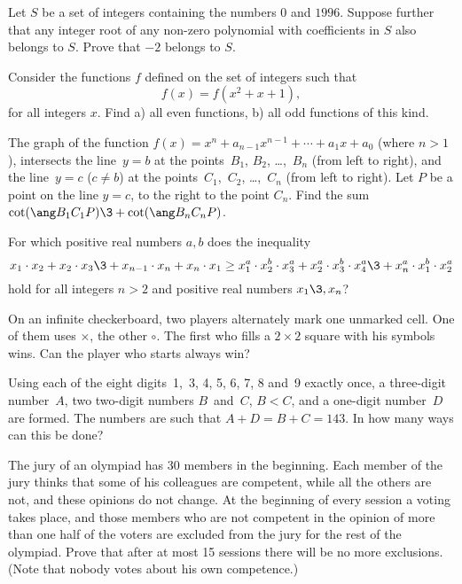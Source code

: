 \prob  %
Let $S$ be a set of integers 
containing the numbers $0$ and $1996$.
Suppose further that any integer root of any
non-zero polynomial with 
coefficients  in $S$ also belongs to $S$. Prove that $-2$ belongs to $S.$





\prob %
Consider the functions $f$ defined on the set of integers such that
   $$f(x)=f(x^2+x+1),$$
for all integers $x$. Find a) all even functions, 
b) all odd functions of this kind.



\prob  %
The graph of the function $f(x)=x^n+a_{n-1}x^{n-1}+\cdots+a_1x+a_0$ (where
$n>1$), intersects the
line~$y=b$ at the points~$B_1$, $B_2$, \dots,~$B_n$ (from left to right),
and the line~$y=c$ ($c\ne b$) at the points~$C_1$,~$C_2$, \dots,~$C_n$
(from left to right).
Let $P$ be a point on the line $y=c$, to the right to the point $C_n$.
Find the sum $\cot(\ang B_1C_1P)\3+\cot(\ang B_nC_nP)$.




\prob   %
For which positive real numbers $a,b$ does the inequality
  $$x_1\cdot x_2+x_2\cdot x_3\3+x_{n-1}\cdot x_n+x_n\cdot x_1
    \ge x_1^a\cdot x_2^b\cdot x_3^a+x_2^a\cdot x_3^b\cdot 
        x_4^a\3+x_n^a\cdot x_1^b\cdot x_2^a$$
hold for all integers $n>2$ and positive real numbers $x_1\3,x_n$?



\prob %
On an infinite checkerboard, two players alternately mark one 
unmarked cell.
One of them uses $\times$, the other $\circ$.  The first who fills
a $2\times 2$ square with his symbols wins.  Can the player who starts
always win?


\prob %
Using each of the eight digits~1,~3, 4, 5, 6, 7, 8 and~9 exactly
once, a three-digit number~$A$, two two-digit numbers
$B$~and~$C$, $B<C$, and a one-digit number~$D$ are formed. 
The numbers are such
that $A+D=B+C=143$. In how many ways can this be done?


\prob %
The jury of an olympiad has 30 members in the beginning.  
Each member of the jury
thinks that some of his colleagues are competent, while all the others are
not, and these opinions do not change.
At the beginning of every session a voting takes place, and
those  members who are not competent
in the opinion of more than one half of the voters
are excluded from the jury for the rest
of the olympiad.  Prove that after at most 15 sessions
there will be no more exclusions.
(Note that nobody votes about his own competence.)




